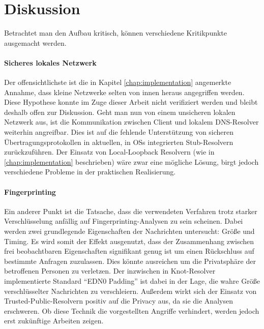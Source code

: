 \section{Diskussion}
Betrachtet man den Aufbau kritisch, können verschiedene Kritikpunkte ausgemacht werden. 

\paragraph{Sicheres lokales Netzwerk}
Der offensichtlichste ist die in Kapitel \ref{chap:implementation} angemerkte Annahme, dass kleine Netzwerke selten von innen heraus angegriffen werden. Diese Hypothese konnte im Zuge dieser Arbeit nicht verifiziert werden und bleibt deshalb offen zur Diskussion. Geht man nun von einem unsicheren lokalen Netzwerk aus, ist die Kommunikation zwischen Client und lokalem DNS-Resolver weiterhin angreifbar. Dies ist auf die fehlende Unterstützung von sicheren Übertragungsprotokollen in aktuellen, in \acp{OS} integrierten Stub-Resolvern zurückzuführen. Der Einsatz von Local-Loopback Resolvern (wie in \ref{chap:implementation} beschrieben) wäre zwar eine mögliche Lösung, birgt jedoch verschiedene Probleme in der praktischen Realisierung.

\paragraph{Fingerprinting}
Ein anderer Punkt ist die Tatsache, dass die verwendeten Verfahren trotz starker Verschlüsselung anfällig auf Fingerprinting-Analysen zu sein scheinen\cite{Shulman2014}\cite{Siby2018}. Dabei werden zwei grundlegende Eigenschaften der Nachrichten untersucht: Größe und Timing. Es wird somit der Effekt ausgenutzt, dass der Zusammenhang zwischen frei beobachtbaren Eigenschaften signifikant genug ist um einen Rückschluss auf bestimmte Anfragen zuzulassen. Dies könnte ausreichen um die Privatsphäre der betroffenen Personen zu verletzen. Der inzwischen in Knot-Resolver implementierte Standard ``EDN0 Padding''\cite{rfc7830} ist dabei in der Lage, die wahre Größe verschlüsselter Nachrichten zu verschleiern. Außerdem wirkt sich der Einsatz von Trusted-Public-Resolvern positiv auf die Privacy aus, da sie die Analysen erschweren\cite{Shulman2014}. Ob diese Technik die vorgestellten Angriffe verhindert, werden jedoch erst zukünftige Arbeiten zeigen. 

